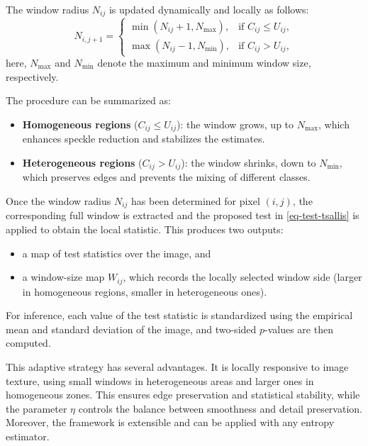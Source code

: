 \documentclass[
  lettersize  journal,
]{IEEEtran}%
\providecommand{\tightlist}{%
  \setlength{\itemsep}{0pt}\setlength{\parskip}{0pt}}\usepackage{longtable,booktabs,array}
\begin{document}
The window radius \(N_{ij}\) is updated dynamically and locally as
follows: \[
N_{i,j+1} =
\begin{cases}
\min(N_{ij} + 1, N_{\max}), & \text{if } C_{ij} \leq U_{ij}, \\
\max(N_{ij} - 1, N_{\min}), & \text{if } C_{ij} > U_{ij},
\end{cases}
\] here, \(N_{\max}\) and \(N_{\min}\) denote the maximum and minimum
window size, respectively.

The procedure can be summarized as:

\begin{itemize}
\tightlist
\item
  \textbf{Homogeneous regions} (\(C_{ij} \leq U_{ij}\)): the window
  grows, up to \(N_{\max}\), which enhances speckle reduction and
  stabilizes the estimates.\\
\item
  \textbf{Heterogeneous regions} (\(C_{ij} > U_{ij}\)): the window
  shrinks, down to \(N_{\min}\), which preserves edges and prevents the
  mixing of different classes.
\end{itemize}

Once the window radius \(N_{ij}\) has been determined for pixel
\((i,j)\), the corresponding full window is extracted and the proposed
test in \eqref{eq-test-tsallis} is applied to obtain the local
statistic. This produces two outputs:

\begin{itemize}
\tightlist
\item
  a map of test statistics over the image, and\\
\item
  a window-size map \(W_{ij}\), which records the locally selected
  window side (larger in homogeneous regions, smaller in heterogeneous
  ones).
\end{itemize}

For inference, each value of the test statistic is standardized using
the empirical mean and standard deviation of the image, and two-sided
\(p\)-values are then computed.

This adaptive strategy has several advantages. It is locally responsive
to image texture, using small windows in heterogeneous areas and larger
ones in homogeneous zones. This ensures edge preservation and
statistical stability, while the parameter \(\eta\) controls the balance
between smoothness and detail preservation. Moreover, the framework is
extensible and can be applied with any entropy estimator.
\end{document}
